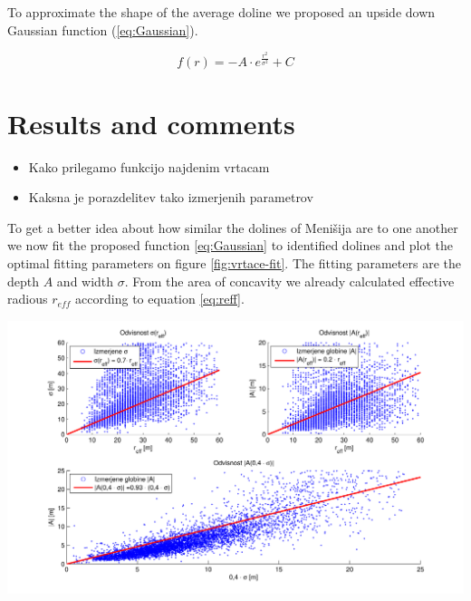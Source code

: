 \documentclass[a0,portrait]{a0poster}
\begin{document}
\begin{multicols}{2}
To approximate the shape of the average doline we proposed an upside down Gaussian function (\ref{eq:Gaussian}).

\begin{equation}
	f(r) = - A \cdot e^{\frac{r^2}{\sigma^2}} + C
	\label{eq:Gaussian}
\end{equation}


\section*{Results and comments}

\begin{itemize}
	\item Kako prilegamo funkcijo najdenim vrtacam
	\item Kaksna je porazdelitev tako izmerjenih parametrov
\end{itemize}

To get a better idea about how similar the dolines of Menišija are to one another we now fit the proposed function \ref{eq:Gaussian} to identified dolines and plot the optimal fitting parameters on figure \ref{fig:vrtace-fit}. The fitting parameters are the depth $A$ and width $\sigma$. From the area of concavity we already calculated effective radious $r_{eff}$ according to equation \ref{eq:reff}.

\begin{center}
\includegraphics[width=\linewidth]{menisija-A-sigma-reff.pdf}
\label{fig:vrtace-fit}
\end{center}


\end{multicols}
\end{document}
